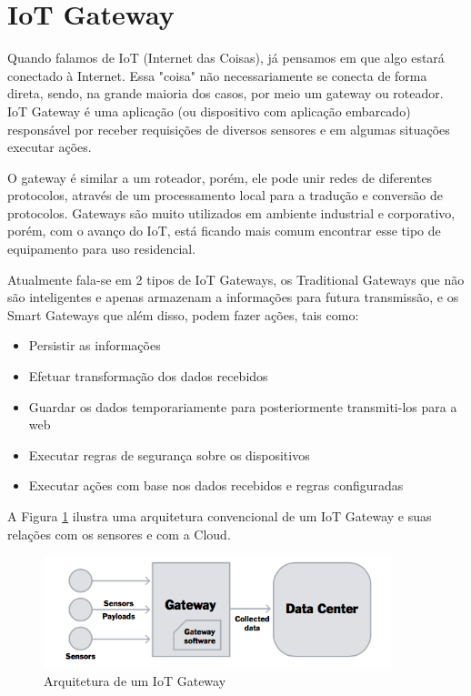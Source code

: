 \section{IoT Gateway}
\label{sec:iotGateway}

Quando falamos de IoT (Internet das Coisas), já pensamos em que algo estará conectado à Internet. Essa "coisa"  não necessariamente se conecta de forma direta, sendo, na grande maioria dos casos, por meio um gateway ou roteador. IoT Gateway é uma aplicação (ou dispositivo com aplicação embarcado) responsável por receber requisições de diversos sensores e em algumas situações executar ações.

O gateway é similar a um roteador, porém, ele pode unir redes de diferentes protocolos, através de um processamento local para a tradução e conversão de protocolos. Gateways são muito utilizados em ambiente industrial e corporativo, porém, com o avanço do IoT, está ficando mais comum encontrar esse tipo de equipamento para uso residencial.

Atualmente fala-se em 2 tipos de IoT Gateways, os Traditional Gateways que não são inteligentes e apenas armazenam a informações para futura transmissão, e os Smart Gateways que além disso, podem fazer ações, tais como:
\begin{itemize}
	\item Persistir as informações
	\item Efetuar transformação dos dados recebidos
	\item Guardar os dados temporariamente para posteriormente transmiti-los para a web
	\item Executar regras de segurança sobre os dispositivos
	\item Executar ações com base nos dados recebidos e regras configuradas
\end{itemize}

A Figura \ref{fig:arquiteturaIotGateway} ilustra uma arquitetura convencional de um IoT Gateway e suas relações com os sensores e com a Cloud.

\begin{figure}[H]
	\centering
	\includegraphics[width=0.9\textwidth]{./img/rumFxS7.png}
	\caption{Arquitetura de um IoT Gateway}
	\label{fig:arquiteturaIotGateway}
\end{figure}


